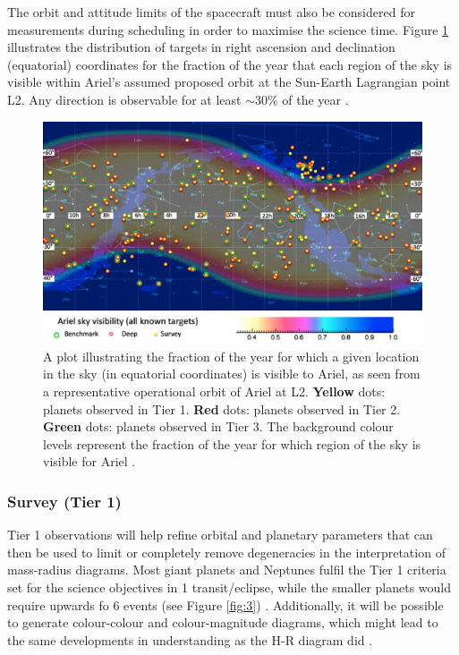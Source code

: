 \documentclass[12pt]{article}
\begin{document}
The orbit and attitude limits of the spacecraft must also be considered for measurements during scheduling in order to maximise the science time. Figure \ref{fig:1} illustrates the distribution of targets in right ascension and declination (equatorial) coordinates for the fraction of the year
that each region of the sky is visible within Ariel's assumed proposed orbit at the Sun-Earth Lagrangian point L2. Any direction is observable for at least $\sim$30\% of the year \cite{zingales2018ariel,morales2022ariel}.

\begin{figure}[H]
    \centering
    \includegraphics[width=.9\textwidth]{ariel target map.png}
    \caption{A plot illustrating the fraction of the year for which a given location in the sky (in equatorial coordinates) is visible to Ariel, as seen from a representative operational
    orbit of Ariel at L2. \textbf{Yellow} dots: planets observed in Tier 1. \textbf{Red} dots: planets observed in Tier 2. \textbf{Green} dots: planets observed in Tier 3. \protect\cite{zingales2018ariel} The background colour levels represent the fraction of the year for which
    region of the sky is visible for Ariel \cite{morales2022ariel}.}
    \label{fig:1}
\end{figure}

\subsubsection{Survey (Tier 1)}

Tier 1 observations will help refine orbital and planetary parameters that can then be used to limit or completely remove degeneracies in the interpretation of mass-radius diagrams.
Most giant planets and Neptunes fulfil the Tier 1 criteria set for the science objectives in 1 transit/eclipse, while the smaller planets would require upwards fo 6 events (see Figure \ref{fig:3}) \cite{zingales2018ariel}.
Additionally, it will be possible to generate colour-colour and colour-magnitude diagrams, which might lead to the same developments in understanding as the H-R diagram did \cite{edwards2019updated,salvignol2024ariel}.
\end{document}
